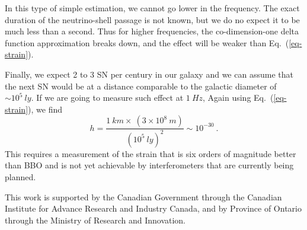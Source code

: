 \documentclass[aps,showpacs,onecolumn,floats,prd,superscriptaddress,nofootinbib]{revtex4-1}
\begin{document}
In this type of simple estimation, we cannot go lower in the frequency. The exact duration of the neutrino-shell passage is not known, but we do no expect it to be much less than a second. Thus for higher frequencies, the co-dimension-one delta function approximation breaks down, and the effect will be weaker than Eq.~(\ref{eq-strain}).

Finally, we expect 2 to 3 SN per century in our galaxy and we can assume that the next SN would be at a distance comparable to the galactic diameter of $\sim 10^5 \ ly$. If we are going to measure such effect at $1 \ Hz$, Again using Eq.~(\ref{eq-strain}), we find
\begin{equation}
	h = \frac{ 1~km \times ~ (3\times10^8~m)}{(10^5~ly)^2}\sim 10^{-30}~.
\end{equation}
This requires a measurement of the strain that is six orders of magnitude better than BBO and is not yet achievable by interferometers that are currently being planned. 


\acknowledgments

This work is supported by the Canadian Government through the Canadian Institute for Advance Research and Industry Canada, and by Province of Ontario through the Ministry of Research and Innovation.

\appendix
\end{document}
